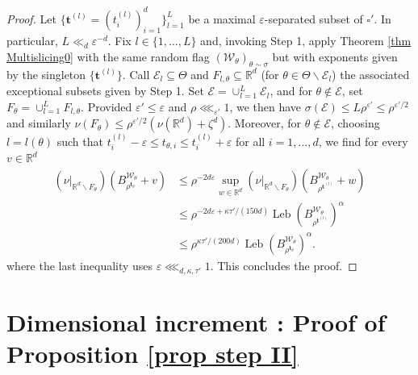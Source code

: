 \documentclass[11pt, leqno, fleqn]{amsart}
\def\cW{\mathcal W}
\def\eps{\varepsilon}
\newcommand{\margem}[1]{\marginpar{{\scriptsize {#1}}}}
\def\cE{          \mathcal E}
\def\clr{   \color{red}}
\def\bt{        \mathbf{t}}
\def \R{{\mathbb R}}
\DeclareMathOperator{\leb}{Leb}
\theoremstyle{definition}
\theoremstyle{definition}
\begin{document}
\begin{proof}
		 Let $\{\bt^{(l)} = (t^{(l)}_i)_{i = 1}^{d} \}_{l=1}^L$ be a maximal $\eps$-separated subset of $\square'$. In particular, $L\ll_{d} \eps^{-d}$.  Fix $l\in \{1, \dots, L\}$ and, invoking Step 1, apply  Theorem \ref{thm Multislicing0} with the same random flag $(\cW_{\theta})_{\theta\sim \sigma}$
		 but with  exponents  given by the singleton $\{\bt^{(l)}\}$. Call $\cE_{l}\subseteq \Theta$ and $F_{l, \theta}\subseteq \R^d$ (for $\theta\in \Theta\smallsetminus \cE_{l}$) the associated exceptional subsets given by Step 1. Set $\cE=\cup_{l=1}^L\cE_{l}$, and for $\theta\notin \cE$, set $F_{\theta}=\cup_{l=1}^L F_{l, \theta}$. Provided   $\eps'\leq \eps$ and $\rho\lll_{\eps'}1$, we then have $\sigma(\cE)\leq L\rho^{\eps'}\leq \rho^{\eps'/2} $ and similarly $ \nu(F_{\theta})\leq \rho^{\eps'/2}(\nu(\R^d) + \zeta^{d})$. Moreover, for $\theta\notin \cE$, choosing $l=l(\theta)$ such that $t^{(l)}_{i}-\eps \leq t_{\theta, i}\leq t^{(l)}_{i} +\eps$ for all $i=1, \dots, d$, we find for every $v \in \R^d$ 
		 \begin{align*}
		 ( \nu|_{\R^d \smallsetminus F_{\theta}} )\left( B^{\cW_{\theta}}_{\rho^{\bt_{\theta} }}+ v \right) 
		 &\leq \rho^{-2d\eps} \sup_{w\in \R^d}( \nu|_{\R^d \smallsetminus F_{\theta}} )\left( B^{\cW_{\theta}}_{\rho^{\bt^{(l)}}}+ w \right) \\
		 &\leq \rho^{-2d\eps+\kappa \tau'/( 150 d) }   \leb \left(B^{\cW_{ \theta}}_{\rho^{\bt^{(l)}}}\right)^{\alpha}\\
		 &\leq \rho^{\kappa \tau'/( 200 d) }   \leb \left(B^{\cW_{ \theta}}_{\rho^{\bt_{\theta}  }}\right)^{\alpha}.
		  \end{align*}
where  the last inequality uses $\eps\lll_{d, \kappa, \tau'}1$. This concludes the proof. 
		
		 
		
		
		 
		 \end{proof}
		 
	
		 
		 
		 
		 
		 
	 
		 
 
		 
		 \section{Dimensional increment : Proof of Proposition \ref{prop step II}} \label{sec proof prop step II}
		 
		 
\end{document}
